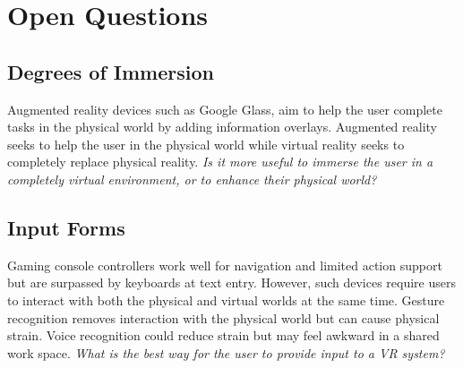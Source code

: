 \documentclass[conference]{IEEEtran}
\begin{document}

\section{Open Questions}

\subsection{Degrees of Immersion}

Augmented reality devices such as Google Glass, aim to help the user complete tasks in the physical world by adding information overlays. 
Augmented reality seeks to help the user in the physical world while virtual reality seeks to completely replace physical reality. 
\emph{Is it more useful to immerse the user in a completely virtual environment, or to enhance their physical world?}



\subsection{Input Forms}
Gaming console controllers work well for navigation and limited action support but are surpassed by keyboards at text entry.
However, such devices require users to interact with both the physical and virtual worlds at the same time.
Gesture recognition removes interaction with the physical world but can cause physical strain.
Voice recognition could reduce strain but may feel awkward in a shared work space.
\emph{What is the best way for the user to provide input to a VR system?}
\end{document}
